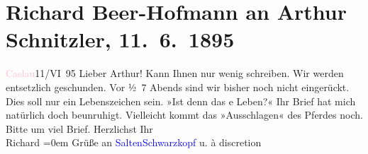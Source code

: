

               \section[Richard Beer-Hofmann an Arthur Schnitzler, 11. 6. 1895]{ Richard Beer-Hofmann an Arthur Schnitzler,
               11. 6. 1895}\nopagebreak{}\rehead{ }\normalsize\beginnumbering{} \toendnotes[C]{\smallbreak\pagebreak[2]} 
\pstart
           {\pb}\textcolor{pink}{Caslau}{}\ledrightnote{\textcolor{pink}{Caslau}}{ }11/VI 95\pend
           \pstart
           Lieber Arthur! Kann Ihnen nur wenig schreiben. Wir werden
               entsetzlich geschunden. Vor ½ 7 Abends
                sind wir bisher noch nicht
               eingerückt. Dies soll nur ein Lebenszeichen sein. »Ist denn {\pb}das e Leben?« Ihr Brief hat mich
               natürlich doch beunruhigt. Vielleicht kommt das »Ausschlagen« des Pferdes noch. Bitte
               um viel Brief. Herzlichst\pend
           \pstart
           Ihr{\\[\baselineskip]}\spacefill\mbox{Richard}\pend
           \leftskip=0em{}\pstart
           Grüße an \textcolor{blue}{Salten}{}\ledrightnote{\textcolor{blue}{Felix Salten}}{ }\textcolor{blue}{Schwarzkopf}{}\ledrightnote{\textcolor{blue}{Gustav Schwarzkopf}} u. à discretion\pend
           \endnumbering{}  
      